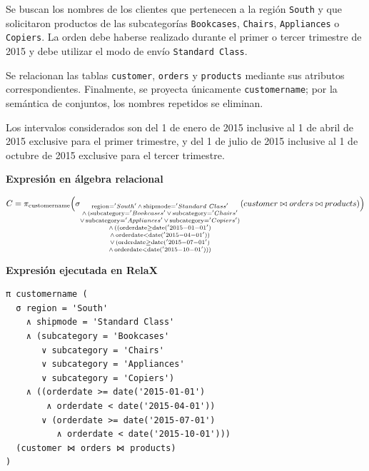 
Se buscan los nombres de los clientes que pertenecen a la región \texttt{South} y que solicitaron productos de las subcategorías \texttt{Bookcases}, \texttt{Chairs}, \texttt{Appliances} o \texttt{Copiers}. La orden debe haberse realizado durante el primer o tercer trimestre de 2015 y debe utilizar el modo de envío \texttt{Standard Class}.

Se relacionan las tablas \texttt{customer}, \texttt{orders} y \texttt{products} mediante sus atributos correspondientes. Finalmente, se proyecta únicamente \texttt{customername}; por la semántica de conjuntos, los nombres repetidos se eliminan.

Los intervalos considerados son del 1 de enero de 2015 inclusive al 1 de abril de 2015 exclusive para el primer trimestre, y del 1 de julio de 2015 inclusive al 1 de octubre de 2015 exclusive para el tercer trimestre.

\textbf{Expresión en álgebra relacional}

\[
C = \pi_{\text{customername}} \Bigl( \sigma_{
  \substack{
    \text{region} = 'South' \,\land\, \text{shipmode} = 'Standard\ Class' \\
    \land\, (\text{subcategory} = 'Bookcases' \,\lor\, \text{subcategory} = 'Chairs' \\
    \lor\, \text{subcategory} = 'Appliances' \,\lor\, \text{subcategory} = 'Copiers') \\
    \land\, ((\text{orderdate} \ge \text{date}('2015-01-01') \\
    \land\, \text{orderdate} < \text{date}('2015-04-01')) \\
    \lor\, (\text{orderdate} \ge \text{date}('2015-07-01') \\
    \land\, \text{orderdate} < \text{date}('2015-10-01')))
  }
} (customer \bowtie orders \bowtie products) \Bigr)
\]


\textbf{Expresión ejecutada en RelaX}

\begin{lstlisting}
π customername (
  σ region = 'South'
    ∧ shipmode = 'Standard Class'
    ∧ (subcategory = 'Bookcases'
       ∨ subcategory = 'Chairs'
       ∨ subcategory = 'Appliances'
       ∨ subcategory = 'Copiers')
    ∧ ((orderdate >= date('2015-01-01')
        ∧ orderdate < date('2015-04-01'))
       ∨ (orderdate >= date('2015-07-01')
          ∧ orderdate < date('2015-10-01')))
  (customer ⋈ orders ⋈ products)
)
\end{lstlisting}

